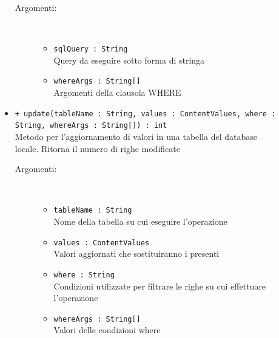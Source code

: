 \documentclass[../DefinizioneDiProdotto.tex]{subfiles}
\begin{document}
\begin{description}
\begin{itemize}
\begin{description}
			\item[Argomenti:] \
			\begin{itemize}
				\item \texttt{sqlQuery : String}\\
				Query da eseguire sotto forma di stringa\item \texttt{whereArgs : String[]}\\
				Argomenti della clausola WHERE\end{itemize}
		\end{description}
		\item \texttt{+ update(tableName : String, values : ContentValues, where : String, whereArgs : String[]) : int}\\
		Metodo per l'aggiornamento di valori in una tabella del database locale. Ritorna il numero di righe modificate 
		\begin{description}
			\item[Argomenti:] \
			\begin{itemize}
				\item \texttt{tableName : String}\\
				Nome della tabella su cui eseguire l'operazione\item \texttt{values : ContentValues}\\
				Valori aggiornati che sostituiranno i presenti\item \texttt{where : String}\\
				Condizioni utilizzate per filtrare le righe su cui effettuare l'operazione\item \texttt{whereArgs : String[]}\\
				Valori delle condizioni where\end{itemize}
		\end{description}
	\end{itemize}
\end{description}
\end{document}
